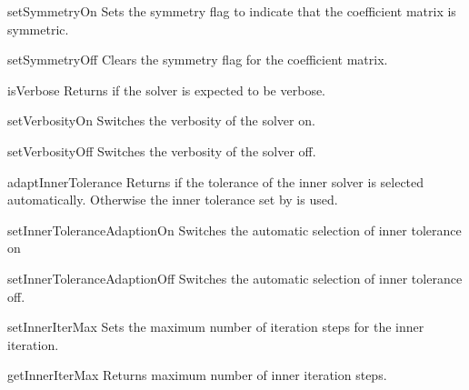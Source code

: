 \begin{methoddesc}[SolverOptions]{setSymmetryOn}{}
Sets the symmetry flag to indicate that the coefficient matrix is symmetric.
\end{methoddesc}

\begin{methoddesc}[SolverOptions]{setSymmetryOff}{}
Clears the symmetry flag for the coefficient matrix.
\end{methoddesc}

\begin{methoddesc}[SolverOptions]{isVerbose}{}
 Returns \True if the solver is expected to be verbose.
\end{methoddesc}


\begin{methoddesc}[SolverOptions]{setVerbosityOn}{}
Switches the verbosity of the solver on.
\end{methoddesc}


\begin{methoddesc}[SolverOptions]{setVerbosityOff}{}
Switches the verbosity of the solver off.
\end{methoddesc}


\begin{methoddesc}[SolverOptions]{adaptInnerTolerance}{}
Returns \True if the tolerance of the inner solver is selected automatically. 
Otherwise the inner tolerance set by  is used.
\end{methoddesc}

\begin{methoddesc}[SolverOptions]{setInnerToleranceAdaptionOn}{}
Switches the automatic selection of inner tolerance on 
\end{methoddesc}

\begin{methoddesc}[SolverOptions]{setInnerToleranceAdaptionOff}{}
Switches the automatic selection of inner tolerance off.
\end{methoddesc}

\begin{methoddesc}[SolverOptions]{setInnerIterMax}{}
Sets the maximum number of iteration steps for the inner iteration.
\end{methoddesc}

\begin{methoddesc}[SolverOptions]{getInnerIterMax}{}
Returns maximum number of inner iteration steps.
\end{methoddesc}


